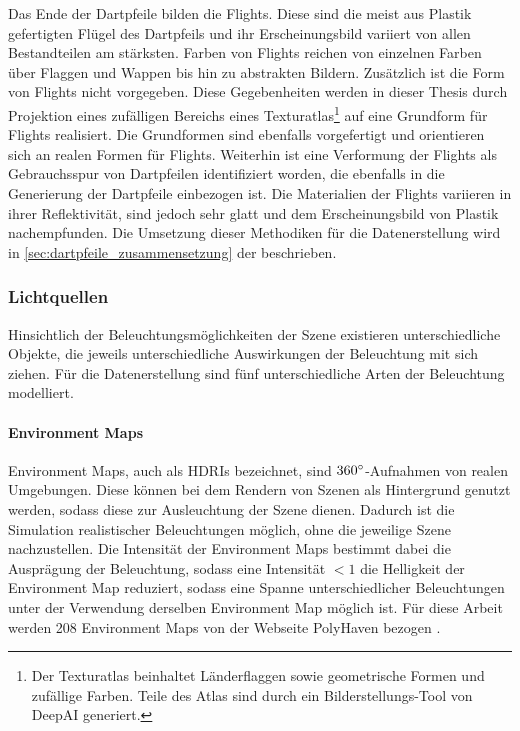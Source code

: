 Das Ende der Dartpfeile bilden die Flights. Diese sind die meist aus Plastik gefertigten Flügel des Dartpfeils und ihr Erscheinungsbild variiert von allen Bestandteilen am stärksten. Farben von Flights reichen von einzelnen Farben über Flaggen und Wappen bis hin zu abstrakten Bildern. Zusätzlich ist die Form von Flights nicht vorgegeben. Diese Gegebenheiten werden in dieser Thesis durch Projektion eines zufälligen Bereichs eines Texturatlas\footnote{Der Texturatlas beinhaltet Länderflaggen sowie geometrische Formen und zufällige Farben. Teile des Atlas sind durch ein Bilderstellungs-Tool von DeepAI \cite{deepai-image} generiert.} auf eine Grundform für Flights realisiert. Die Grundformen sind ebenfalls vorgefertigt und orientieren sich an realen Formen für Flights. Weiterhin ist eine Verformung der Flights als Gebrauchsspur von Dartpfeilen identifiziert worden, die ebenfalls in die Generierung der Dartpfeile einbezogen ist. Die Materialien der Flights variieren in ihrer Reflektivität, sind jedoch sehr glatt und dem Erscheinungsbild von Plastik nachempfunden. Die Umsetzung dieser Methodiken für die Datenerstellung wird in \autoref{sec:dartpfeile_zusammensetzung} der  beschrieben.

\subsubsection{Lichtquellen}
\label{sec:lichter}

Hinsichtlich der Beleuchtungsmöglichkeiten der Szene existieren unterschiedliche Objekte, die jeweils unterschiedliche Auswirkungen der Beleuchtung mit sich ziehen. Für die Datenerstellung sind fünf unterschiedliche Arten der Beleuchtung modelliert.

\paragraph{Environment Maps}

Environment Maps, auch als HDRIs bezeichnet, sind $360^{\circ}$-Aufnahmen von realen Umgebungen. Diese können bei dem Rendern von Szenen als Hintergrund genutzt werden, sodass diese zur Ausleuchtung der Szene dienen. Dadurch ist die Simulation realistischer Beleuchtungen möglich, ohne die jeweilige Szene nachzustellen. Die Intensität der Environment Maps bestimmt dabei die Ausprägung der Beleuchtung, sodass eine Intensität $< 1$ die Helligkeit der Environment Map reduziert, sodass eine Spanne unterschiedlicher Beleuchtungen unter der Verwendung derselben Environment Map möglich ist. Für diese Arbeit werden 208 Environment Maps von der Webseite PolyHaven bezogen \cite{polyhaven}.

